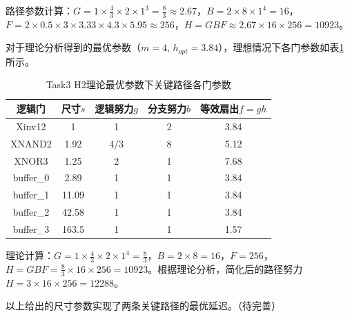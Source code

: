 \documentclass[UTF8,12pt,a4paper]{ctexart}
\begin{document}
路径参数计算：$G = 1 \times \frac{4}{3} \times 2 \times 1^3 = \frac{8}{3} \approx 2.67$，$B = 2 \times 8 \times 1^4 = 16$，$F = 2 \times 0.5 \times 3 \times 3.33 \times 4.3 \times 5.95 \approx 256$，$H = GBF \approx 2.67 \times 16 \times 256 = 10923$。

对于理论分析得到的最优参数（$m=4$, $h_{opt}=3.84$），理想情况下各门参数如表\ref{tab:task3_h2_theo_params}所示。

\begin{table}[htbp]
\centering
\caption{Task3 H2理论最优参数下关键路径各门参数}
\label{tab:task3_h2_theo_params}
\begin{tabular}{|c|c|c|c|c|}
\hline
逻辑门 & 尺寸$s$ & 逻辑努力$g$ & 分支努力$b$ & 等效扇出$f=gh$ \\
\hline
Xinv12 & 1 & 1 & 2 & 3.84 \\
XNAND2 & 1.92 & 4/3 & 8 & 5.12 \\
XNOR3 & 1.25 & 2 & 1 & 7.68 \\
buffer\_0 & 2.89 & 1 & 1 & 3.84 \\
buffer\_1 & 11.09 & 1 & 1 & 3.84 \\
buffer\_2 & 42.58 & 1 & 1 & 3.84 \\
buffer\_3 & 163.5 & 1 & 1 & 1.57 \\
\hline
\end{tabular}
\end{table}

理论计算：$G = 1 \times \frac{4}{3} \times 2 \times 1^4 = \frac{8}{3}$，$B = 2 \times 8 = 16$，$F = 256$，$H = GBF = \frac{8}{3} \times 16 \times 256 = 10923$。根据理论分析，简化后的路径努力$H = 3 \times 16 \times 256 = 12288$。

以上给出的尺寸参数实现了两条关键路径的最优延迟。（待完善）
\end{document}
